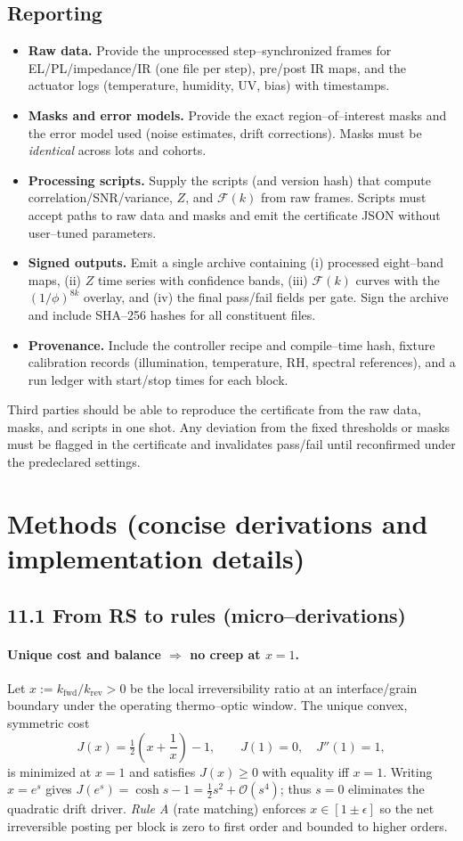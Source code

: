 \documentclass[12pt]{article}
\begin{document}
\subsection*{Reporting}
\begin{itemize}
  \item \textbf{Raw data.} Provide the unprocessed step–synchronized frames for EL/PL/impedance/IR (one file per step), pre/post IR maps, and the actuator logs (temperature, humidity, UV, bias) with timestamps.
  \item \textbf{Masks and error models.} Provide the exact region–of–interest masks and the error model used (noise estimates, drift corrections). Masks must be \emph{identical} across lots and cohorts.
  \item \textbf{Processing scripts.} Supply the scripts (and version hash) that compute correlation/SNR/variance, $Z$, and $\mathcal{F}(k)$ from raw frames. Scripts must accept paths to raw data and masks and emit the certificate JSON without user–tuned parameters.
  \item \textbf{Signed outputs.} Emit a single archive containing (i) processed eight–band maps, (ii) $Z$ time series with confidence bands, (iii) $\mathcal{F}(k)$ curves with the $(1/\phi)^{8k}$ overlay, and (iv) the final pass/fail fields per gate. Sign the archive and include SHA–256 hashes for all constituent files.
  \item \textbf{Provenance.} Include the controller recipe and compile–time hash, fixture calibration records (illumination, temperature, RH, spectral references), and a run ledger with start/stop times for each block.
\end{itemize}
Third parties should be able to reproduce the certificate from the raw data, masks, and scripts in one shot. Any deviation from the fixed thresholds or masks must be flagged in the certificate and invalidates pass/fail until reconfirmed under the predeclared settings.

\section{Methods (concise derivations and implementation details)}

\subsection*{11.1 From RS to rules (micro–derivations)}
\paragraph{Unique cost and balance $\Rightarrow$ no creep at $x=1$.}
Let $x:=k_{\mathrm{fwd}}/k_{\mathrm{rev}}>0$ be the local irreversibility ratio at an interface/grain boundary under the operating thermo–optic window. The unique convex, symmetric cost
\[
J(x)=\tfrac12\!\left(x+\frac1x\right)-1,\qquad J(1)=0,\quad J''(1)=1,
\]
is minimized at $x=1$ and satisfies $J(x)\ge 0$ with equality iff $x=1$. Writing $x=e^{s}$ gives $J(e^{s})=\cosh s-1=\tfrac12 s^2+\mathcal{O}(s^4)$; thus $s=0$ eliminates the quadratic drift driver. \emph{Rule A} (rate matching) enforces $x\in[1\pm\epsilon]$ so the net irreversible posting per block is zero to first order and bounded to higher orders.
\end{document}

